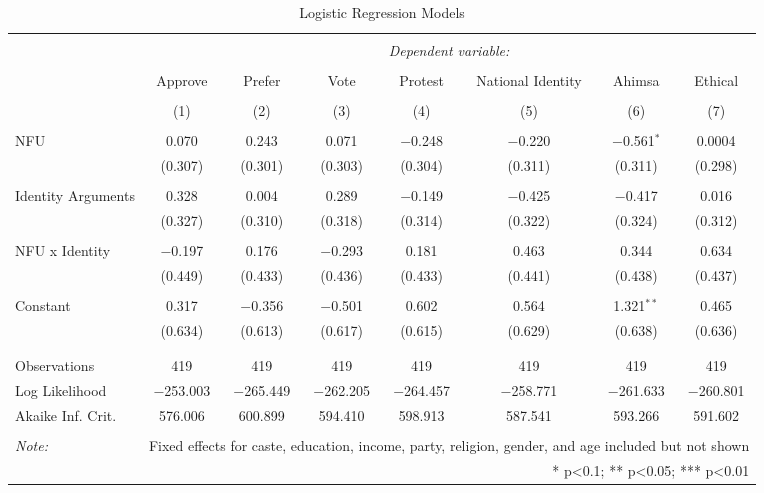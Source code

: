 \documentclass[12pt]{article}
\begin{document}
\newpage
\begin{landscape}
\begin{table}[!htbp] \centering 
  \caption{Logistic Regression Models} 
  \label{} 
\begin{tabular}{@{\extracolsep{5pt}}lccccccc} 
\\[-1.8ex]\hline 
\hline \\[-1.8ex] 
 & \multicolumn{7}{c}{\textit{Dependent variable:}} \\ 
\cline{2-8} 
\\[-1.8ex] & Approve & Prefer & Vote & Protest & National Identity & Ahimsa & Ethical \\ 
\\[-1.8ex] & (1) & (2) & (3) & (4) & (5) & (6) & (7)\\ 
\hline \\[-1.8ex] 
 NFU & 0.070 & 0.243 & 0.071 & $-$0.248 & $-$0.220 & $-$0.561$^{*}$ & 0.0004 \\ 
  & (0.307) & (0.301) & (0.303) & (0.304) & (0.311) & (0.311) & (0.298) \\ 
  & & & & & & & \\ 
 Identity Arguments & 0.328 & 0.004 & 0.289 & $-$0.149 & $-$0.425 & $-$0.417 & 0.016 \\ 
  & (0.327) & (0.310) & (0.318) & (0.314) & (0.322) & (0.324) & (0.312) \\ 
  & & & & & & & \\ 
 NFU x Identity & $-$0.197 & 0.176 & $-$0.293 & 0.181 & 0.463 & 0.344 & 0.634 \\ 
  & (0.449) & (0.433) & (0.436) & (0.433) & (0.441) & (0.438) & (0.437) \\ 
  & & & & & & & \\ 
 Constant & 0.317 & $-$0.356 & $-$0.501 & 0.602 & 0.564 & 1.321$^{**}$ & 0.465 \\ 
  & (0.634) & (0.613) & (0.617) & (0.615) & (0.629) & (0.638) & (0.636) \\ 
  & & & & & & & \\ 
\hline \\[-1.8ex] 
Observations & 419 & 419 & 419 & 419 & 419 & 419 & 419 \\ 
Log Likelihood & $-$253.003 & $-$265.449 & $-$262.205 & $-$264.457 & $-$258.771 & $-$261.633 & $-$260.801 \\ 
Akaike Inf. Crit. & 576.006 & 600.899 & 594.410 & 598.913 & 587.541 & 593.266 & 591.602 \\ 
\hline 
\hline \\[-1.8ex] 
\textit{Note:}  & \multicolumn{7}{r}{Fixed effects for caste, education, income, party, religion, gender, and age included but not shown} \\ 
 & \multicolumn{7}{r}{* p<0.1; ** p<0.05; *** p<0.01} \\ 
\end{tabular} 
\end{table} 

\end{landscape}
\end{document}
